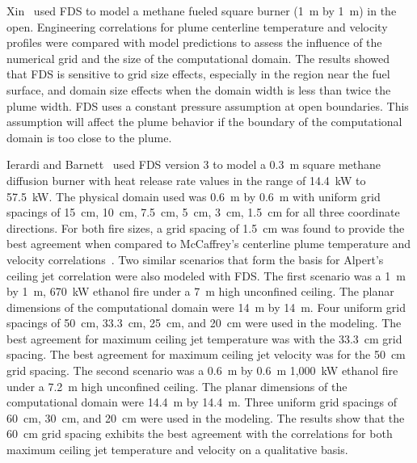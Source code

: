 \documentclass[11pt]{book}
\begin{document}
Xin~\cite{Xin:NFPA2004}  used FDS  to  model a  methane fueled  square burner (1~m  by 1~m) in  the open. Engineering correlations  for plume
centerline temperature and velocity  profiles were compared with model predictions to assess the influence of the numerical grid and the size of the
computational domain. The  results showed that FDS is sensitive to grid size effects, especially  in the region near the fuel surface, and domain
size  effects when the domain width is  less than twice the plume  width.  FDS  uses   a  constant  pressure  assumption  at  open boundaries.  This
assumption  will affect  the plume  behavior  if the boundary of the computational domain is too close to the plume.

Ierardi  and Barnett~\cite{Ierardi:1} used  FDS version  3 to  model a 0.3~m square methane diffusion burner with heat release rate values in the
range of 14.4~kW to 57.5~kW. The physical domain used was 0.6~m by 0.6~m with uniform grid spacings of  15~cm, 10~cm, 7.5~cm, 5~cm, 3~cm, 1.5~cm for all three
coordinate  directions. For both  fire sizes, a grid  spacing of 1.5~cm  was found  to  provide  the best  agreement  when compared  to McCaffrey's
centerline    plume    temperature     and    velocity correlations~\cite{SFPE:Heskestad}.  Two similar  scenarios  that form the basis for Alpert's
ceiling  jet correlation were also modeled with FDS. The first scenario was a  1~m by 1~m, 670~kW ethanol fire under a 7~m   high  unconfined
ceiling.   The  planar   dimensions  of   the computational domain were 14~m by  14~m. Four uniform grid spacings of 50~cm, 33.3~cm, 25~cm, and 20~cm were
used in the modeling. The best agreement for  maximum  ceiling  jet  temperature  was  with  the  33.3~cm  grid spacing. The best  agreement for
maximum ceiling jet  velocity was for the  50~cm grid  spacing. The  second scenario  was a  0.6~m  by 0.6~m 1,000~kW ethanol fire under a 7.2~m high
unconfined ceiling. The planar dimensions of  the computational domain  were 14.4~m by  14.4~m. Three uniform  grid  spacings  of  60~cm, 30~cm, and
20~cm  were  used  in  the modeling. The  results show that  the 60~cm grid spacing  exhibits the best  agreement with  the correlations  for both
maximum  ceiling jet temperature and velocity on a qualitative basis.
\end{document}
